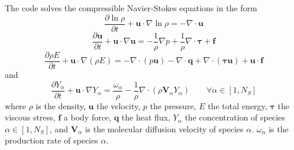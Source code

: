 \documentclass[notitlepage]{revtex4-1}
\begin{document}
The code solves the compressible Navier-Stokes equations in the form
\begin{equation}\frac{\partial\ln\rho}{\partial{t}}+\bm{u}\cdot\nabla\ln\rho=-\nabla\cdot\bm{u}\label{eq:mass}\end{equation}
\begin{equation}\frac{\partial\bm{u}}{\partial{t}}+\bm{u}\cdot\nabla\bm{u}=-\frac{1}{\rho}\nabla{p}+\frac{1}{\rho}\nabla\cdot\bm{\tau}+\bm{f}\label{eq:mom}\end{equation}
\begin{equation}\frac{\partial\rho{E}}{\partial{t}}+\bm{u}\cdot\nabla\left(\rho{E}\right)=-\nabla\cdot\left(p\bm{u}\right)-\nabla\cdot\bm{q}+\nabla\cdot\left(\bm{\tau}\bm{u}\right)+\bm{u}\cdot\bm{f}\label{eq:en}\end{equation}
and
\begin{equation}\frac{\partial{Y}_{\alpha}}{\partial{t}}+\bm{u}\cdot\nabla{Y}_{\alpha}=\frac{\dot\omega_{\alpha}}{\rho}-\frac{1}{\rho}\nabla\cdot\left(\rho\bm{V}_{\alpha}Y_{\alpha}\right)\qquad\forall\alpha\in\left[1,N_{S}\right]\label{eq:Y}\end{equation}
where $\rho$ is the density, $\bm{u}$ the velocity, $p$ the pressure, $E$ the total energy, $\bm{\tau}$ the viscous stress, $\bm{f}$ a body force, $\bm{q}$ the heat flux, $Y_{\alpha}$ the concentration of species $\alpha\in\left[1,N_{S}\right]$, and $\bm{V}_{\alpha}$ is the molecular diffusion velocity of species $\alpha$. $\dot\omega_{\alpha}$ is the production rate of species $\alpha$.
\end{document}
